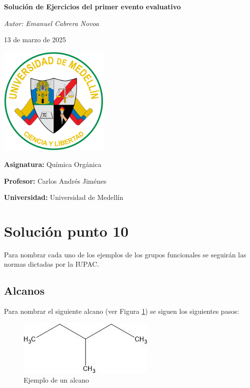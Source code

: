 \documentclass{article}
\begin{document}
\begin{titlepage}
    \centering
    \vspace*{2cm}
    
    {\Huge\bfseries Solución de Ejercicios del primer evento evaluativo\par}
    \vspace{1.5cm}
    
    {\Large\itshape Autor: Emanuel Cabrera Novoa\par}
    \vspace{1cm}
    
    {\large 13 de marzo de 2025\par}
    \vspace{2cm}
    
    \includegraphics[width=0.4\textwidth]{media/Escudo_Universidad_de_Medellin.svg.png}
    \vfill
    
    {\large \textbf{Asignatura:} Química Orgánica\par}
    \vspace{0.5cm}
    
    {\large \textbf{Profesor:} Carlos Andrés Jiménes\par}
    \vspace{0.5cm}
    
    {\large \textbf{Universidad:} Universidad de Medellín\par}
    \vspace{1cm}
    
    \vfill
\end{titlepage}

\section{Solución punto 10}
Para nombrar cada uno de los ejemplos de los grupos funcionales se seguirán las normas dictadas por la IUPAC.

\subsection{Alcanos}
Para nombrar el siguiente alcano (ver Figura \ref{fig:alcano}) se siguen los siguientes pasos:
\begin{figure}[h]
    \centering
    \includegraphics[width=0.5\linewidth]{media/3-metilpentano.jpg}
    \caption{Ejemplo de un alcano}
    \label{fig:alcano}
\end{figure}
\end{document}
